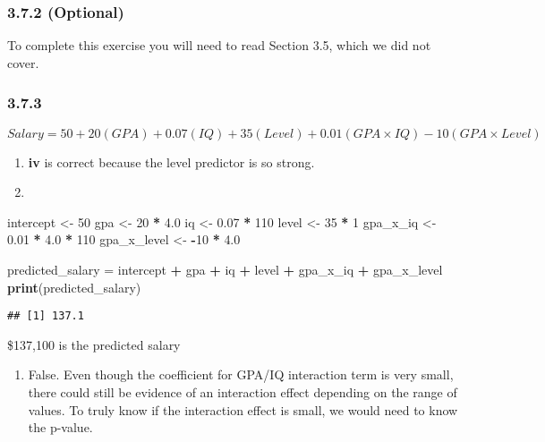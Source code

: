 \documentclass[
]{article}
\newenvironment{Shaded}{\begin{snugshade}}{\end{snugshade}}
\newcommand{\DecValTok}[1]{\textcolor[rgb]{0.00,0.00,0.81}{#1}}
\newcommand{\FloatTok}[1]{\textcolor[rgb]{0.00,0.00,0.81}{#1}}
\newcommand{\FunctionTok}[1]{\textcolor[rgb]{0.13,0.29,0.53}{\textbf{#1}}}
\newcommand{\NormalTok}[1]{#1}
\newcommand{\OtherTok}[1]{\textcolor[rgb]{0.56,0.35,0.01}{#1}}
\newcommand{\SpecialCharTok}[1]{\textcolor[rgb]{0.81,0.36,0.00}{\textbf{#1}}}
\providecommand{\tightlist}{%
  \setlength{\itemsep}{0pt}\setlength{\parskip}{0pt}}
\begin{document}
\subsubsection{3.7.2 (Optional)}\label{optional}

To complete this exercise you will need to read Section 3.5, which we
did not cover.

\subsubsection{3.7.3}\label{section-1}

\(Salary=50+20(GPA)+0.07(IQ)+35(Level)+0.01(GPA×IQ)−10(GPA×Level)\)

\begin{enumerate}
\def\labelenumi{\alph{enumi}.}
\tightlist
\item
  \textbf{iv} is correct because the level predictor is so strong.
\item
\end{enumerate}

\begin{Shaded}
\begin{Highlighting}[]
\NormalTok{intercept }\OtherTok{\textless{}{-}} \DecValTok{50}
\NormalTok{gpa }\OtherTok{\textless{}{-}} \DecValTok{20} \SpecialCharTok{*} \FloatTok{4.0}
\NormalTok{iq }\OtherTok{\textless{}{-}} \FloatTok{0.07} \SpecialCharTok{*} \DecValTok{110}
\NormalTok{level }\OtherTok{\textless{}{-}} \DecValTok{35} \SpecialCharTok{*} \DecValTok{1}
\NormalTok{gpa\_x\_iq }\OtherTok{\textless{}{-}} \FloatTok{0.01} \SpecialCharTok{*} \FloatTok{4.0} \SpecialCharTok{*} \DecValTok{110}
\NormalTok{gpa\_x\_level }\OtherTok{\textless{}{-}} \SpecialCharTok{{-}}\DecValTok{10} \SpecialCharTok{*} \FloatTok{4.0}

\NormalTok{predicted\_salary }\OtherTok{=}\NormalTok{ intercept }\SpecialCharTok{+}\NormalTok{ gpa }\SpecialCharTok{+}\NormalTok{ iq }\SpecialCharTok{+}\NormalTok{ level }\SpecialCharTok{+}\NormalTok{ gpa\_x\_iq }\SpecialCharTok{+}\NormalTok{ gpa\_x\_level}
\FunctionTok{print}\NormalTok{(predicted\_salary)}
\end{Highlighting}
\end{Shaded}

\begin{verbatim}
## [1] 137.1
\end{verbatim}

\$137,100 is the predicted salary

\begin{enumerate}
\def\labelenumi{\alph{enumi}.}
\setcounter{enumi}{2}
\tightlist
\item
  False. Even though the coefficient for GPA/IQ interaction term is very
  small, there could still be evidence of an interaction effect
  depending on the range of values. To truly know if the interaction
  effect is small, we would need to know the p-value.
\end{enumerate}
\end{document}
